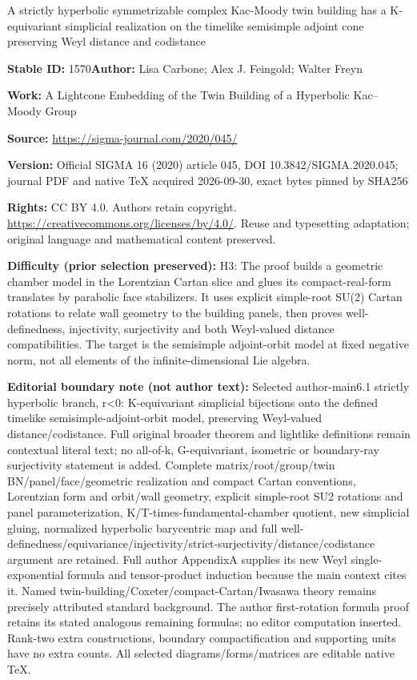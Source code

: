 \documentclass[11pt]{article}
\numberwithin{equation}{section}
\numberwithin{equation}{section}
\begin{document}
\begin{center}\Large A strictly hyperbolic symmetrizable complex Kac-Moody twin building has a K-equivariant simplicial realization on the timelike semisimple adjoint cone preserving Weyl distance and codistance\end{center}
\noindent\textbf{Stable ID:} 1570\quad\textbf{Author:} Lisa Carbone; Alex J. Feingold; Walter Freyn\par
\noindent\textbf{Work:} A Lightcone Embedding of the Twin Building of a Hyperbolic Kac–Moody Group\par
\noindent\textbf{Source:} \url{https://sigma-journal.com/2020/045/}\par
\noindent\textbf{Version:} Official SIGMA 16 (2020) article 045, DOI 10.3842/SIGMA.2020.045; journal PDF and native TeX acquired 2026-09-30, exact bytes pinned by SHA256\par
\noindent\textbf{Rights:} CC BY 4.0. Authors retain copyright. \url{https://creativecommons.org/licenses/by/4.0/}. Reuse and typesetting adaptation; original language and mathematical content preserved.\par
\noindent\textbf{Difficulty (prior selection preserved):} {\CJKfont H3: The proof builds a geometric chamber model in the Lorentzian Cartan slice and glues its compact-real-form translates by parabolic face stabilizers. It uses explicit simple-root SU(2) Cartan rotations to relate wall geometry to the building panels, then proves well-definedness, injectivity, surjectivity and both Weyl-valued distance compatibilities. The target is the semisimple adjoint-orbit model at fixed negative norm, not all elements of the infinite-dimensional Lie algebra.}\par
\medskip\noindent\textbf{Editorial boundary note (not author text):} Selected author-main6.1 strictly hyperbolic branch, r<0: K-equivariant simplicial bijections onto the defined timelike semisimple-adjoint-orbit model, preserving Weyl-valued distance/codistance. Full original broader theorem and lightlike definitions remain contextual literal text; no all-of-k, G-equivariant, isometric or boundary-ray surjectivity statement is added. Complete matrix/root/group/twin BN/panel/face/geometric realization and compact Cartan conventions, Lorentzian form and orbit/wall geometry, explicit simple-root SU2 rotations and panel parameterization, K/T-times-fundamental-chamber quotient, new simplicial gluing, normalized hyperbolic barycentric map and full well-definedness/equivariance/injectivity/strict-surjectivity/distance/codistance argument are retained. Full author AppendixA supplies its new Weyl single-exponential formula and tensor-product induction because the main context cites it. Named twin-building/Coxeter/compact-Cartan/Iwasawa theory remains precisely attributed standard background. The author first-rotation formula proof retains its stated analogous remaining formulas; no editor computation inserted. Rank-two extra constructions, boundary compactification and supporting units have no extra counts. All selected diagrams/forms/matrices are editable native TeX.\par
\end{document}
